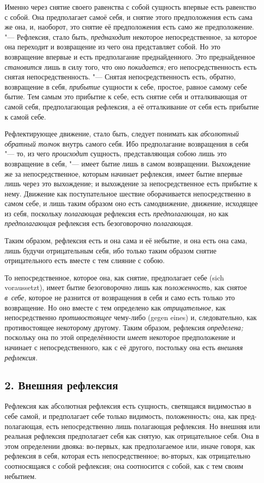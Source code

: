 Именно через снятие своего равенства с собой сущность впервые есть равенство
с собой. Она предполагает самоё себя, и снятие этого предположения есть
сама же она, и, наоборот, это снятие её предположения есть само же
предположение. "--- Рефлексия, стало быть,
{\em преднаходит} некоторое непосредственное, за
которое она переходит и возвращение из чего она представляет собой. Но это
возвращение впервые и есть предполагание преднайденного. Это преднайденное
{\em становится} лишь в силу того, что оно
{\em покидается;} его непосредственность есть снятая
непосредственность. "--- Снятая непосредственность есть, обратно, возвращение
в себя, {\em прибытие} сущности к себе, простое, равное
самому себе бытие. Тем самым это прибытие к себе, есть снятие себя и
отталкивающая от самой себя, предполагающая рефлексия, а её отталкивание от
себя есть прибытие к самой себе.

Рефлектирующее движение, стало быть, следует понимать как
{\em абсолютный обратный толчок} внутрь самого себя.
Ибо предполагание возвращения в себя "--- то, из чего
{\em происходит} сущность, представляющая собою лишь
это возвращение в себя, "--- имеет бытие лишь в самом возвращении. Выхождение
же за непосредственное, которым начинает рефлексия, имеет бытие впервые
лишь через это выхождение; и выхождение за непосредственное есть прибытие к
нему. Движение как поступательное шествие оборачивается непосредственно в
самом себе, и лишь таким образом оно есть самодвижение, движение, исходящее
из себя, поскольку {\em полагающая} рефлексия есть
{\em предполагающая,} но как
{\em предполагающая} рефлексия есть безоговорочно
{\em полагающая}.

Таким образом, рефлексия есть и она сама и её небытие, и она есть она сама,
лишь будучи отрицательным себя, ибо только таким образом снятие
отрицательного есть вместе с тем слияние с собою.

То непосредственное, которое она, как снятие, предполагает себе (sich
voraussetzt), имеет бытие безоговорочно лишь как
{\em положенность,} как снятое
{\em в~себе,} которое не разнится от возвращения в себя
и само есть только это возвращение. Но оно вместе с тем определено как
{\em отрицательное,} как непосредственно
{\em противостоящее} чему-либо (gegen eines) и,
следовательно, как противостоящее некоторому другому. Таким образом,
рефлексия {\em определена;} поскольку она по этой
определённости {\em имеет} некоторое предположение и
начинает с непосредственного, как с её другого, постольку она есть
{\em внешняя рефлексия}.

\subsection[2. Внешняя рефлексия]{2. Внешняя рефлексия}
Рефлексия как абсолютная рефлексия есть
сущность, светящаяся видимостью в себе самой, и предполагает себе только
видимость, положенность; она, как пред-полагающая, есть непосредственно
лишь полагающая рефлексия. Но внешняя или реальная рефлексия предполагает
себя как снятую, как отрицательное себя. Она в этом определении двояка:
во-первых, как предполагаемое или, иначе говоря, как рефлексия в себя,
которая есть непосредственное; во-вторых, как отрицательно соотносящаяся с
собой рефлексия; она соотносится с собой, как с тем своим небытием.

